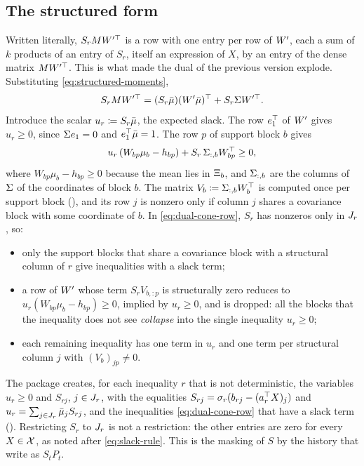 \subsection{The structured form}

Written literally, $S_rMW'^\top$ is a row with one entry per row of $W'$, each a sum of $k$ products of an entry of $S_r$, itself an expression of $X$, by an entry of the dense matrix $MW'^\top$.
This is what made the dual of the previous version explode.
Substituting \eqref{eq:structured-moments},
\begin{equation}
\label{eq:dual-identity}
S_r M W'^\top = (S_r\bar\mu)(W'\bar\mu)^\top + S_r\Sigma W'^\top.
\end{equation}
Introduce the scalar $u_r \coloneqq S_r\bar\mu$, the expected slack.
The row $e_1^\top$ of $W'$ gives $u_r \ge 0$, since $\Sigma e_1 = 0$ and $e_1^\top\bar\mu = 1$.
The row $p$ of support block $b$ gives
\begin{equation}
\label{eq:dual-cone-row}
u_r\,(W_{bp}\mu_b - h_{bp}) + S_r\, \Sigma_{:,b} W_{bp}^\top \ge 0,
\end{equation}
where $W_{bp}\mu_b - h_{bp} \ge 0$ because the mean lies in $\Xi_{b}$,
and $\Sigma_{:,b}$ are the columns of $\Sigma$ of the coordinates of block $b$.
The matrix $V_b \coloneqq \Sigma_{:,b}W_b^\top$ is computed once per support block (),
and its row $j$ is nonzero only if column $j$ shares a covariance block with some coordinate of $b$.
In \eqref{eq:dual-cone-row}, $S_r$ has nonzeros only in $J_r$, so:
\begin{itemize}[nosep]
\item only the support blocks that share a covariance block with a structural column of $r$ give inequalities with a slack term;
\item a row of $W'$ whose term $S_r V_{b,:p}$ is structurally zero reduces to $u_r(W_{bp}\mu_b - h_{bp}) \ge 0$, implied by $u_r \ge 0$, and is dropped:
all the blocks that the inequality does not see \emph{collapse} into the single inequality $u_r \ge 0$;
\item each remaining inequality has one term in $u_r$ and one term per structural column $j$ with $(V_b)_{jp} \neq 0$.
\end{itemize}
The package creates, for each inequality $r$ that is not deterministic, the variables $u_r \ge 0$ and $S_{rj}$, $j \in J_r$,
with the equalities $S_{rj} = \sigma_r(b_{rj} - (a_r^\top X)_j)$ and $u_r = \sum_{j\in J_r} \bar\mu_j S_{rj}$,
and the inequalities \eqref{eq:dual-cone-row} that have a slack term ().
Restricting $S_r$ to $J_r$ is not a restriction: the other entries are zero for every $X \in \mathcal{X}$, as noted after \eqref{eq:slack-rule}.
This is the masking of $S$ by the history that \citet[(4.6)]{KWG2011} write as $S_tP_t$.

